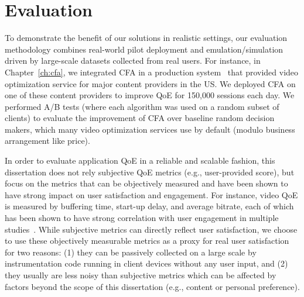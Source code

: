 \section{Evaluation}

To demonstrate the benefit of our solutions in realistic settings, 
our evaluation methodology combines real-world pilot deployment and 
emulation/simulation driven by large-scale datasets collected from real  users.
For instance, in Chapter~\ref{ch:cfa}, we integrated CFA in a production 
system~\cite{c3} that provided video optimization service for major content
providers in the US.
We deployed CFA on one of these content providers to improve QoE for
150,000 sessions each day. We performed A/B tests (where each algorithm
was used on a random subset of clients) to evaluate
the improvement of CFA over baseline random decision
makers, which many video optimization services use
by default (modulo business arrangement like price).

In order to evaluate application QoE in a reliable 
and scalable fashion, this dissertation does not rely subjective QoE 
metrics (e.g., user-provided score), but focus on the metrics that can be
objectively measured and 
have been shown to have strong impact on user satisfaction 
and engagement.
For instance, video QoE is measured by buffering time, start-up delay,
and average bitrate, each of which has been shown to have strong
correlation with user engagement in multiple 
studies~\cite{sigcomm11,imc12akamai}.
While subjective metrics can directly reflect user satisfaction, we
choose to use these objectively measurable 
metrics as a proxy for real user satisfaction for two reasons:
(1) they can be passively collected on a large scale by instrumentation code 
running in client devices without any user input, and (2) they usually
are less noisy than subjective metrics which can be affected by factors
beyond the scope of this dissertation (e.g., content or personal preference).




